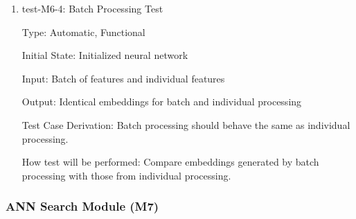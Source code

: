 \documentclass[12pt, titlepage]{article}
\begin{document}
\begin{enumerate}
\item{test-M6-4: Batch Processing Test\\}

Type: Automatic, Functional

Initial State: Initialized neural network

Input: Batch of features and individual features

Output: Identical embeddings for batch and individual processing

Test Case Derivation: Batch processing should behave the same as individual processing.

How test will be performed: Compare embeddings generated by batch processing with those from individual processing.

\end{enumerate}
\subsubsection{ANN Search Module (M7)}
\end{document}
